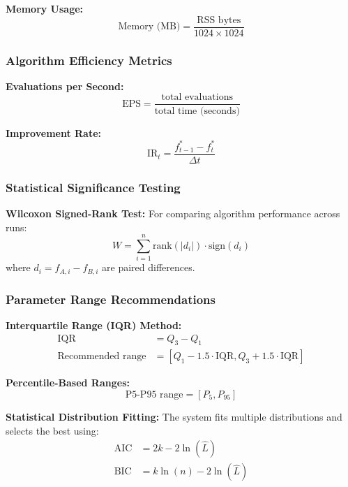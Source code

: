\documentclass[12pt,a4paper]{article}
\begin{document}
\textbf{Memory Usage:}
\begin{equation}
\text{Memory (MB)} = \frac{\text{RSS bytes}}{1024 \times 1024} \label{eq:memory_usage}
\end{equation}

\subsubsection{Algorithm Efficiency Metrics}
\textbf{Evaluations per Second:}
\begin{equation}
\text{EPS} = \frac{\text{total evaluations}}{\text{total time (seconds)}} \label{eq:evaluations_per_second}
\end{equation}

\textbf{Improvement Rate:}
\begin{equation}
\text{IR}_t = \frac{f^*_{t-1} - f^*_t}{\Delta t} \label{eq:improvement_rate}
\end{equation}

\subsubsection{Statistical Significance Testing}
\textbf{Wilcoxon Signed-Rank Test:}
For comparing algorithm performance across runs:
\begin{equation}
W = \sum_{i=1}^n \text{rank}(|d_i|) \cdot \text{sign}(d_i) \label{eq:wilcoxon_test}
\end{equation}
where $d_i = f_{A,i} - f_{B,i}$ are paired differences.

\subsubsection{Parameter Range Recommendations}
\textbf{Interquartile Range (IQR) Method:}
\begin{align}
\text{IQR} &= Q_3 - Q_1 \label{eq:iqr_calculation} \\
\text{Recommended range} &= [Q_1 - 1.5 \cdot \text{IQR}, Q_3 + 1.5 \cdot \text{IQR}] \label{eq:iqr_range}
\end{align}

\textbf{Percentile-Based Ranges:}
\begin{equation}
\text{P5-P95 range} = [P_5, P_{95}] \label{eq:percentile_range}
\end{equation}

\textbf{Statistical Distribution Fitting:}
The system fits multiple distributions and selects the best using:
\begin{align}
\text{AIC} &= 2k - 2\ln(\hat{L}) \label{eq:aic_criterion} \\
\text{BIC} &= k \ln(n) - 2\ln(\hat{L}) \label{eq:bic_criterion}
\end{align}
\end{document}
